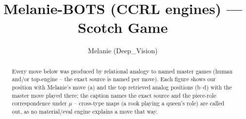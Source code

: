 \documentclass[11pt]{article}
\title{Melanie-BOTS (CCRL engines) — Scotch Game}
\author{Melanie (Deep\_Vision)}
\date{}
\begin{document}
\maketitle

\begin{abstract}Every move below was produced by relational analogy to named master games (human and/or top-engine -- the exact source is named per move). Each figure shows our position with Melanie's move (a) and the top retrieved analog positions (b--d) with the master move played there; the caption names the exact source and the piece-role correspondence under $\mu$ -- cross-type maps (a rook playing a queen's role) are called out, as no material/eval engine explains a move that way.\end{abstract}

\begin{figure}[p]\centering
\begin{subfigure}{0.46\textwidth}\centering
\resizebox{\linewidth}{!}{%
\newchessgame
\chessboard[
  setfen={r1b1kb1r/p1ppqppp/2p2n2/4P3/8/8/PPP1QPPP/RNB1KB1R b KQkq - 2 7},
  showmover=false,
  pgfstyle=straightmove, color=movearrow, markmove={f6-d5}
]}
\caption{}
\end{subfigure}\hfill
\begin{subfigure}{0.46\textwidth}\centering
\resizebox{\linewidth}{!}{%
\newchessgame
\chessboard[
  setfen={r1b1kb1r/p1ppqppp/2p2n2/4P3/8/8/PPP1QPPP/RNB1KB1R b KQkq - 2 7},
  showmover=false,
  pgfstyle=straightmove, color=movearrow, markmove={f6-d5}
]}
\caption{}
\end{subfigure}
\\[4pt]
\begin{subfigure}{0.46\textwidth}\centering
\resizebox{\linewidth}{!}{%
\newchessgame
\chessboard[
  setfen={r1b1kb1r/p1ppqppp/2p2n2/4P3/8/8/PPP1QPPP/RNB1KB1R b KQkq - 2 7},
  showmover=false,
  pgfstyle=straightmove, color=movearrow, markmove={f6-d5}
]}
\caption{}
\end{subfigure}\hfill
\begin{subfigure}{0.46\textwidth}\centering
\resizebox{\linewidth}{!}{%
\newchessgame
\chessboard[
  setfen={r1b1kb1r/p1ppqppp/2p2n2/4P3/8/8/PPP1QPPP/RNB1KB1R b KQkq - 2 7},
  showmover=false,
  pgfstyle=straightmove, color=movearrow, markmove={f6-d5}
]}
\caption{}
\end{subfigure}

\end{figure}
\end{document}
